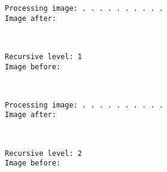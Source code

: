 \documentclass[11pt]{article}
\begin{document}
    \begin{Verbatim}[commandchars=\\\{\}]
Processing image: . . . . . . . . . . 
Image after:

    \end{Verbatim}

    \begin{center}
    \end{center}
    { \hspace*{\fill} \\}
    
    \begin{Verbatim}[commandchars=\\\{\}]
Recursive level: 1
Image before:

    \end{Verbatim}

    \begin{center}
    \end{center}
    { \hspace*{\fill} \\}
    
    \begin{Verbatim}[commandchars=\\\{\}]
Processing image: . . . . . . . . . . 
Image after:

    \end{Verbatim}

    \begin{center}
    \end{center}
    { \hspace*{\fill} \\}
    
    \begin{Verbatim}[commandchars=\\\{\}]
Recursive level: 2
Image before:

    \end{Verbatim}

    \begin{center}
    \end{center}
    { \hspace*{\fill} \\}
    
\end{document}
